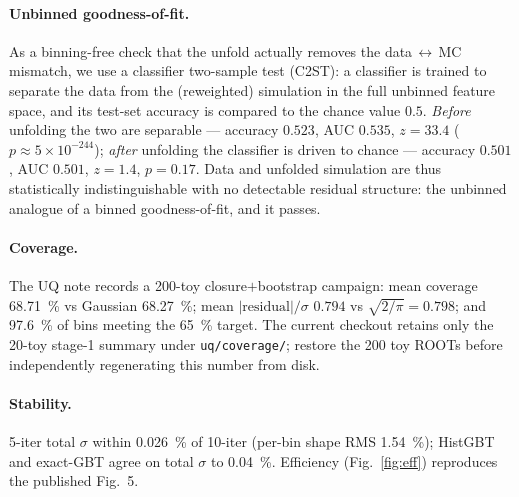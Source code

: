 \paragraph{Unbinned goodness-of-fit.}
As a binning-free check that the unfold actually removes the data\,$\leftrightarrow$\,MC
mismatch, we use a classifier two-sample test (C2ST): a classifier is trained to separate the
data from the (reweighted) simulation in the full unbinned feature space, and its
test-set accuracy is compared to the chance value $0.5$. \emph{Before} unfolding the two are
separable --- accuracy $0.523$, AUC $0.535$, $z=33.4$ ($p\approx5\times10^{-244}$);
\emph{after} unfolding the classifier is driven to chance --- accuracy $0.501$, AUC $0.501$,
$z=1.4$, $p=0.17$. Data and unfolded simulation are thus statistically indistinguishable with
no detectable residual structure: the unbinned analogue of a binned goodness-of-fit, and it
passes.

\paragraph{Coverage.}
The UQ note records a 200-toy closure$+$bootstrap campaign: mean coverage
\SI{68.71}{\percent} vs Gaussian \SI{68.27}{\percent}; mean
$|\mathrm{residual}|/\sigma$ $0.794$ vs $\sqrt{2/\pi}=0.798$; and
\SI{97.6}{\percent} of bins meeting the \SI{65}{\percent} target. The current
checkout retains only the 20-toy stage-1 summary under \texttt{uq/coverage/};
restore the 200 toy ROOTs before independently regenerating this number from
disk.

\paragraph{Stability.}
5-iter total $\sigma$ within \SI{0.026}{\percent} of 10-iter (per-bin shape RMS
\SI{1.54}{\percent}); HistGBT and exact-GBT agree on total $\sigma$ to
\SI{0.04}{\percent}. Efficiency (Fig.~\ref{fig:eff}) reproduces the published
Fig.~5.

